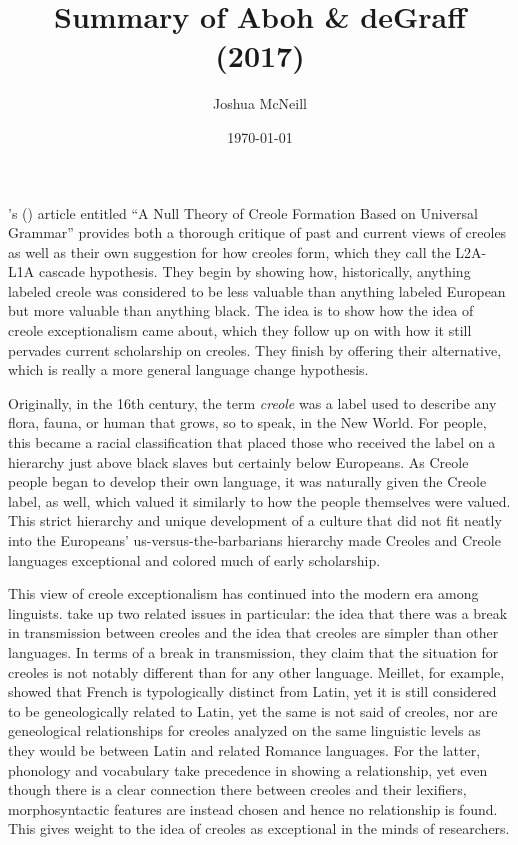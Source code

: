 \documentclass{article}
\title{Summary of Aboh \& deGraff (2017)}
\author{Joshua McNeill}
\date{\today}
\newcommand{\lexi}[1]{\textit{#1}}
\newcommand{\titl}[1]{``#1''}
\begin{document}
  \maketitle
  \onehalfspacing
    \citeauthor{roberts_null_2017}'s (\citeyear{roberts_null_2017}) article entitled \titl{A Null Theory of Creole Formation Based on Universal Grammar} provides both a thorough critique of past and current views of creoles as well as their own suggestion for how creoles form, which they call the L2A-L1A cascade hypothesis.
    They begin by showing how, historically, anything labeled creole was considered to be less valuable than anything labeled European but more valuable than anything black.
    The idea is to show how the idea of creole exceptionalism came about, which they follow up on with how it still pervades current scholarship on creoles.
    They finish by offering their alternative, which is really a more general language change hypothesis.

    Originally, in the 16th century, the term \lexi{creole} was a label used to describe any flora, fauna, or human that grows, so to speak, in the New World.
    For people, this became a racial classification that placed those who received the label on a hierarchy just above black slaves but certainly below Europeans.
    As Creole people began to develop their own language, it was naturally given the Creole label, as well, which valued it similarly to how the people themselves were valued.
    This strict hierarchy and unique development of a culture that did not fit neatly into the Europeans' us-versus-the-barbarians hierarchy made Creoles and Creole languages exceptional and colored much of early scholarship.

    This view of creole exceptionalism has continued into the modern era among linguists.
    \textcite{roberts_null_2017} take up two related issues in particular: the idea that there was a break in transmission between creoles and the idea that creoles are simpler than other languages.
    In terms of a break in transmission, they claim that the situation for creoles is not notably different than for any other language.
    Meillet, for example, showed that French is typologically distinct from Latin, yet it is still considered to be geneologically related to Latin, yet the same is not said of creoles, nor are geneological relationships for creoles analyzed on the same linguistic levels as they would be between Latin and related Romance languages.
    For the latter, phonology and vocabulary take precedence in showing a relationship, yet even though there is a clear connection there between creoles and their lexifiers, morphosyntactic features are instead chosen and hence no relationship is found.
    This gives weight to the idea of creoles as exceptional in the minds of researchers.
\end{document}
